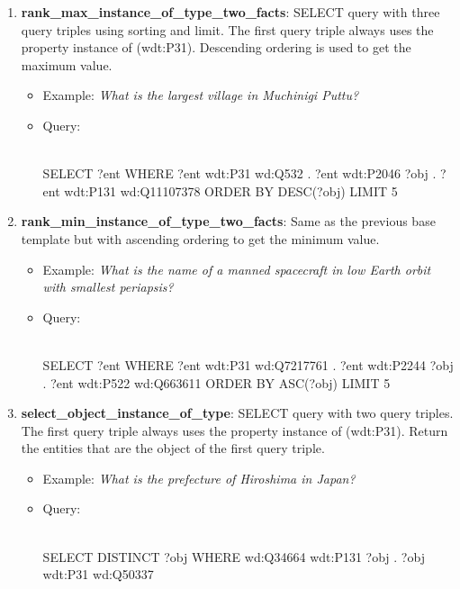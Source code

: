\begin{enumerate}
    \item \textbf{rank\_max\_instance\_of\_type\_two\_facts}: SELECT query with three query triples using 
    sorting and limit. The first query triple always uses the property instance of (wdt:P31). 
    Descending ordering is used to get the maximum value.
    \begin{itemize}
        \item Example: \textit{What is the largest village in Muchinigi Puttu?}
        \item Query:\\
        \mbox{}\\
        \begin{sparqlcode}[]
SELECT ?ent WHERE { 
    ?ent wdt:P31 wd:Q532 . 
    ?ent wdt:P2046 ?obj . 
    ?ent wdt:P131 wd:Q11107378 
} ORDER BY DESC(?obj) LIMIT 5
        \end{sparqlcode}
    \end{itemize}
    
    \item \textbf{rank\_min\_instance\_of\_type\_two\_facts}: Same as the previous base template but with 
    ascending ordering to get the minimum value.
    \begin{itemize}
        \item Example: \textit{What is the name of a manned spacecraft in low Earth orbit with 
        smallest periapsis?}
        \item Query:\\
        \mbox{}\\
        \begin{sparqlcode}[]
SELECT ?ent WHERE { 
    ?ent wdt:P31 wd:Q7217761 . 
    ?ent wdt:P2244 ?obj . 
    ?ent wdt:P522 wd:Q663611
} ORDER BY ASC(?obj) LIMIT 5
        \end{sparqlcode}
    \end{itemize}
    
    \item \textbf{select\_object\_instance\_of\_type}: SELECT query with two query triples. The first 
    query triple always uses the property instance of (wdt:P31). Return the entities that are the 
    object of the first query triple.
    \begin{itemize}
        \item Example: \textit{What is the prefecture of Hiroshima in Japan?}
        \item Query:\\
        \mbox{}\\
        \begin{sparqlcode}[]
SELECT DISTINCT ?obj WHERE { 
    wd:Q34664 wdt:P131 ?obj . 
    ?obj wdt:P31 wd:Q50337 
}
        \end{sparqlcode}
    \end{itemize}
    

\end{enumerate}
